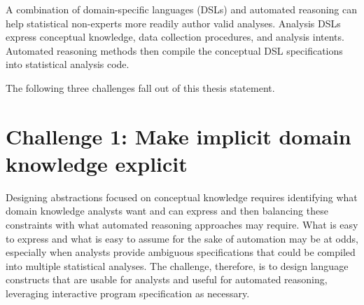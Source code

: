 

A combination of domain-specific languages (DSLs) and automated reasoning can
help statistical non-experts more readily author valid analyses. Analysis DSLs
express conceptual knowledge, data collection procedures, and
analysis intents. Automated reasoning methods then compile the conceptual
DSL specifications into statistical analysis code.


The following three challenges fall out of this thesis statement.

\def\thesisChallengeExplicit{\textbf{Thesis Challenge 1: Explicating domain knowledge}}
\section*{Challenge 1: Make implicit domain knowledge explicit} %
Designing abstractions focused on conceptual knowledge requires identifying what
domain knowledge analysts want and can express and then balancing these
constraints with what automated reasoning approaches may require. What is easy
to express and what is easy to assume for the sake of automation may be at odds,
especially when analysts provide ambiguous specifications that could be compiled
into multiple statistical analyses. The challenge, therefore, is to design
language constructs that are usable for analysts and useful for automated
reasoning, leveraging interactive program specification as necessary.


